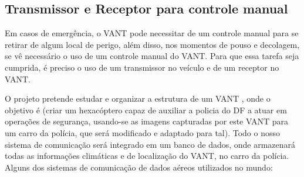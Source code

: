 \subsection{Transmissor e Receptor para controle manual}

Em casos de emergência, o VANT pode necessitar de um controle manual para se retirar de algum local de perigo, além disso, nos momentos de pouso e decolagem, se vê necessário o uso de um controle manual do VANT. Para que essa tarefa seja cumprida, é preciso o uso de um transmissor no veículo e de um receptor no VANT.

O projeto pretende estudar e organizar a estrutura de um VANT , onde o objetivo é (criar um hexacóptero capaz de auxiliar a policia do DF a atuar em operações de segurança, usando-se as imagens capturadas por este VANT para um carro da polícia, que será modificado e adaptado para tal). Todo o nosso sistema de comunicação será integrado em um banco de dados, onde armazenará todas as informações climáticas e de localização do VANT, no carro da polícia. Alguns dos sistemas de comunicação de dados aéreos utilizados no mundo:

